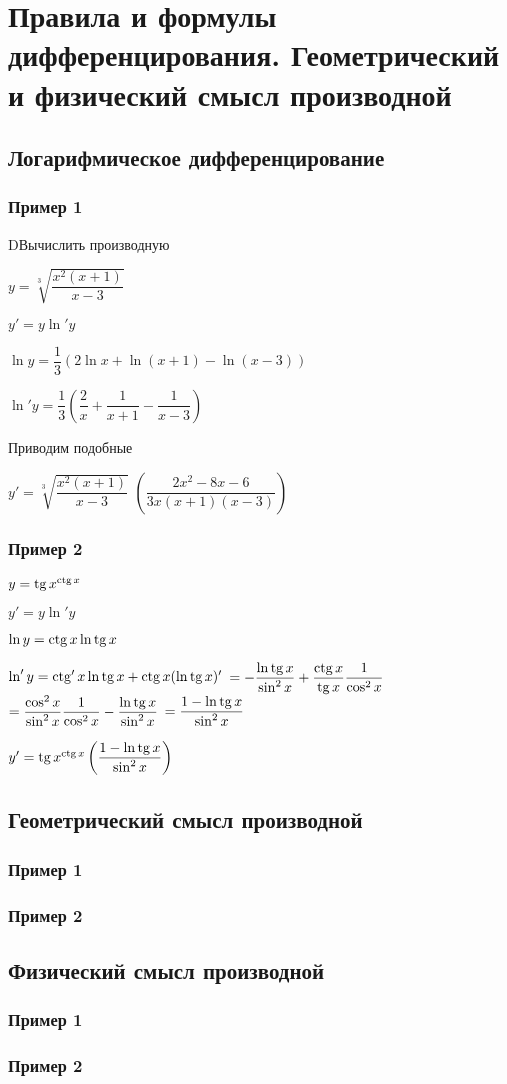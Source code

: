 \section{Правила и формулы дифференцирования. Геометрический и физический смысл производной}

\subsection{Логарифмическое дифференцирование}

\subsubsection{Пример 1}

DВычислить производную

$ y = \sqrt[3]{ \dfrac{x^{2}( x+1 )}{ x-3 } } $

$ y' = y \ln' y $

$ \ln y = \dfrac{1}{3} 
\left(
2 \ln x + \ln(x+1) - \ln(x-3)
\right)  $

$ \ln' y = \dfrac{1}{3} 
\left(
\dfrac{2}{x} + \dfrac{1}{x+1} - \dfrac{1}{x-3}
\right)  $

Приводим подобные

$ y' = \sqrt[3]{ \dfrac{x^{2}( x+1 )}{ x-3 } } $
$ \left( \dfrac{2x^{2} - 8x - 6}{3x(x+1)(x-3)} \right)  $

\subsubsection{Пример 2}

$ y = \operatorname{tg} x^{\operatorname{ctg} x}$

$ y' = y \ln' y $

$  \ln y = \operatorname{ctg} x \ln \operatorname{tg} x $

$  \ln' y = \operatorname{ctg}' x \ln \operatorname{tg} x + \operatorname{ctg} x (\ln \operatorname{tg} x)' $
$ = -\dfrac{\ln \operatorname{tg} x}{\sin^{2} x} +\dfrac{ \operatorname{ctg} x}{\operatorname{tg} x} \dfrac{1}{\cos^{2} x} $
$ = \dfrac{ \cos^{2} x}{\sin^{2} x} \dfrac{1}{\cos^{2} x} - \dfrac{\ln \operatorname{tg} x}{\sin^{2} x} $
$ = \dfrac{1 - \ln \operatorname{tg} x}{\sin^{2} x} $

$ y' = \operatorname{tg} x^{\operatorname{ctg} x} \left( \dfrac{1 - \ln \operatorname{tg} x}{\sin^{2} x} \right)  $

\subsection{Геометрический смысл производной}

\subsubsection{Пример 1}

\subsubsection{Пример 2}

\subsection{Физический смысл производной}

\subsubsection{Пример 1}

\subsubsection{Пример 2}
